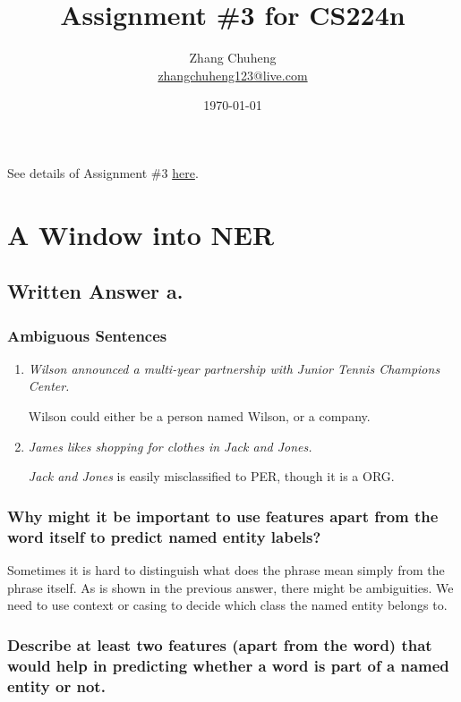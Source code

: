 \documentclass[ENG]{Sketch}
\title{Assignment \#3 for CS224n}
\author{Zhang Chuheng \\ \href{mailto:zhangchuheng123@live.com}{zhangchuheng123@live.com}}
\date{\today}
\begin{document}
  
\maketitle 

See details of Assignment \#3 \href{http://web.stanford.edu/class/cs224n/assignment3/index.html}{here}.

\section{A Window into NER}

\subsection{Written Answer a.}

\subsubsection{Ambiguous Sentences}

\begin{enumerate}
\item \emph{Wilson announced a multi-year partnership with Junior Tennis Champions Center.} 

Wilson could either be a person named Wilson, or a company.

\item \emph{James likes shopping for clothes in Jack and Jones.}

\emph{Jack and Jones} is easily misclassified to PER, though it is a ORG. 

\end{enumerate}

\subsubsection{Why might it be important to use features apart from the word itself to predict
named entity labels?}

Sometimes it is hard to distinguish what does the phrase mean simply from the phrase itself. As is shown in the previous answer, there might be ambiguities. We need to use context or casing to decide which class the named entity belongs to.

\subsubsection{Describe at least two features (apart from the word) that would help in predicting
whether a word is part of a named entity or not.}
\end{document}
